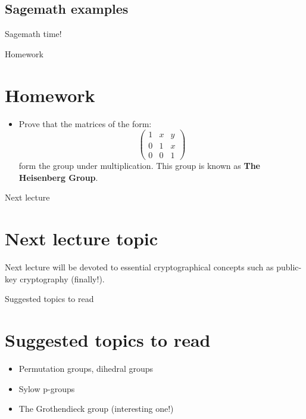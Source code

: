 \documentclass{beamer}
\begin{document}
\begin{frame}{}
	\section{Sagemath examples}
	\begin{center}
		Sagemath time!
	\end{center}
\end{frame}

\begin{frame}{Homework}
    \section{Homework}
	\begin{itemize}
		\item Prove that the matrices of the form:
		$$\begin{pmatrix}
			1 & x & y \\
			0 & 1 & x \\
			0 & 0 & 1
		\end{pmatrix}$$ 
		form the group under multiplication. This group is known as 
		\textbf{The Heisenberg Group}.
	\end{itemize}
\end{frame}

\begin{frame}{Next lecture}
    \section{Next lecture topic}
	Next lecture will be devoted to essential cryptographical concepts such as 
	public-key cryptography (finally!). 
\end{frame}

\begin{frame}{Suggested topics to read}
    \section{Suggested topics to read}
    \begin{itemize}
		\item Permutation groups, dihedral groups
		\item Sylow p-groups
		\item The Grothendieck group (interesting one!)
	\end{itemize}    
\end{frame}
\end{document}
